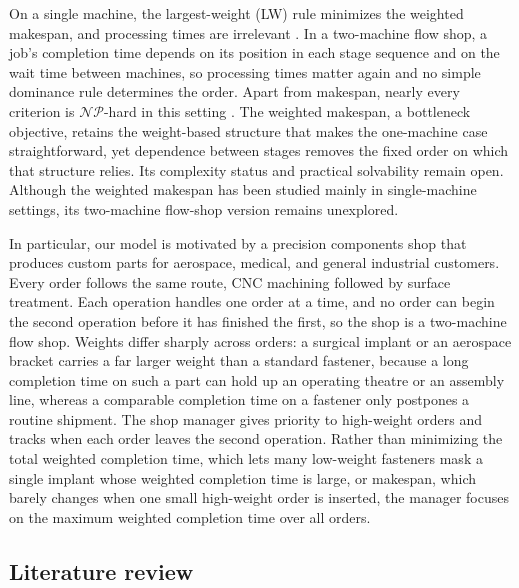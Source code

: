 \documentclass[12pt]{article} \textheight=24.5cm \textwidth=16.5cm \parskip = 0.165cm
\begin{document}
\begin{sloppypar}
        On a single machine, the largest-weight (LW) rule minimizes the weighted makespan, and processing times are irrelevant \citep{Pinedo2022scheduling}. In a two-machine flow shop, a job's completion time depends on its position in each stage sequence and on the wait time between machines, so processing times matter again and no simple dominance rule determines the order. Apart from makespan, nearly every criterion is $\mathcal{NP}$-hard in this setting \citep{AgnetisBillautPinedoShabtay2025EJOR}. The weighted makespan, a bottleneck objective, retains the weight-based structure that makes the one-machine case straightforward, yet dependence between stages removes the fixed order on which that structure relies. Its complexity status and practical solvability remain open. Although the weighted makespan has been studied mainly in single-machine settings, its two-machine flow-shop version remains unexplored.
        
        In particular, our model is motivated by a precision components shop that
        produces custom parts for aerospace, medical, and general industrial customers.
        Every order follows the same route, CNC machining followed by surface treatment.
        Each operation handles one order at a time, and no order can begin the second
        operation before it has finished the first, so the shop is a two-machine flow
        shop. Weights differ sharply across orders: a surgical implant or an aerospace
        bracket carries a far larger weight than a standard fastener, because a long
        completion time on such a part can hold up an operating theatre or an assembly
        line, whereas a comparable completion time on a fastener only postpones a routine
        shipment. The shop manager gives priority to high-weight orders and tracks when
        each order leaves the second operation. Rather than minimizing the total weighted
        completion time, which lets many low-weight fasteners mask a single implant whose
        weighted completion time is large, or makespan, which barely changes when one
        small high-weight order is inserted, the manager focuses on the maximum weighted
        completion time over all orders.
        
      
        
        \subsection{Literature review}
        

\end{sloppypar}
\end{document}

